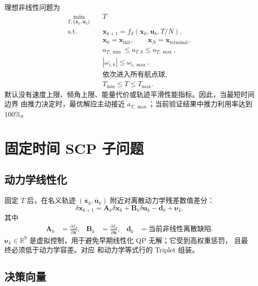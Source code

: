 \documentclass[UTF8,a4paper,11pt]{ctexart}
\newcommand{\R}{\mathbb{R}}
\newcommand{\code}[1]{\texttt{\detokenize{#1}}}
\begin{document}
理想非线性问题为
\begin{equation}
\begin{aligned}
  \min_{T,\{\bm x_k,\bm u_k\}}\quad & T \\
  \text{s.t.}\quad
  & \bm x_{k+1}=f_d(\bm x_k,\bm u_k,T/N), \\
  & \bm x_0=\bm x_{\mathrm{init}},\qquad
    \bm x_N=\bm x_{\mathrm{terminal}}, \\
  & a_{T,\min}\leq a_{T,k}\leq a_{T,\max}, \\
  & |\omega_{i,k}|\leq\omega_{i,\max}, \\
  & \text{依次进入所有航点球}, \\
  & T_{\min}\leq T\leq T_{\max}.
\end{aligned}
\label{eq:original-problem}
\end{equation}
默认没有速度上限、倾角上限、能量代价或轨迹平滑性能指标。因此，当最短时间边界
由推力决定时，最优解应主动接近 $a_{T,\max}$；当前验证结果中推力利用率达到
$100\%$。

\section{固定时间 SCP 子问题}

\subsection{动力学线性化}

固定 $T$ 后，在名义轨迹
$(\bar{\bm x}_k,\bar{\bm u}_k)$ 附近对离散动力学残差数值差分：
\begin{equation}
  \delta\bm x_{k+1}
  =
  \bm A_k\delta\bm x_k+
  \bm B_k\delta\bm u_k
  -\bm d_k+\bm\nu_k .
  \label{eq:linear-dynamics}
\end{equation}
其中
\begin{align}
  \bm A_k&=\frac{\partial f_d}{\partial\bm x},&
  \bm B_k&=\frac{\partial f_d}{\partial\bm u},&
  \bm d_k&=\text{当前非线性离散缺陷}.
\end{align}
$\bm\nu_k\in\R^9$ 是虚拟控制，用于避免早期线性化 QP 无解；它受到高权重惩罚，
且最终必须低于动力学容差。对应 \code{linearize()} 和动力学等式行的 Triplet 组装。

\subsection{决策向量}
\end{document}
